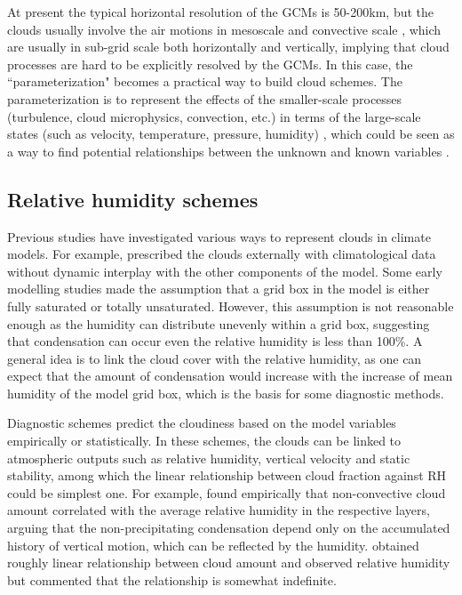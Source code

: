 At present the typical horizontal resolution of the GCMs is 50-200km, but the clouds usually involve the air motions in mesoscale and convective scale \citep{Houze2014}, which are usually in sub-grid scale both horizontally and vertically, implying that cloud processes are hard to be explicitly resolved by the GCMs. In this case, the ``parameterization" becomes a practical way to build cloud schemes. The parameterization is to represent the effects of the smaller-scale processes (turbulence, cloud microphysics, convection, etc.) in terms of the large-scale states (such as velocity, temperature, pressure, humidity) \citep{Randall2003}, which could be seen as a way to find potential relationships between the unknown and known variables \citep{Randall1989}.


\subsection{Relative humidity schemes}
Previous studies have investigated various ways to represent clouds in climate models. For example, \cite{Holloway1971} prescribed the clouds externally with climatological data without dynamic interplay with the other components of the model. Some early modelling studies made the assumption that a grid box in the model is either fully saturated or totally unsaturated. However, this assumption is not reasonable enough as the humidity can distribute unevenly within a grid box, suggesting that condensation can occur even the relative humidity is less than 100\%. A general idea is to link the cloud cover with the relative humidity, as one can expect that the amount of condensation would increase with the increase of mean humidity of the model grid box, which is the basis for some diagnostic methods.

Diagnostic schemes predict the cloudiness based on the model variables empirically or statistically. In these schemes, the clouds can be linked to atmospheric outputs such as relative humidity, vertical velocity and static stability, among which the linear relationship between cloud fraction against RH could be simplest one. For example, \cite{Smagorinsky1960} found empirically that non-convective cloud amount correlated with the average relative humidity in the respective layers, arguing that the non-precipitating condensation depend only on the accumulated history of vertical motion, which can be reflected by the humidity. \cite{Ricketts1973} obtained roughly linear relationship between cloud amount and observed relative humidity but commented that the relationship is somewhat indefinite. %

